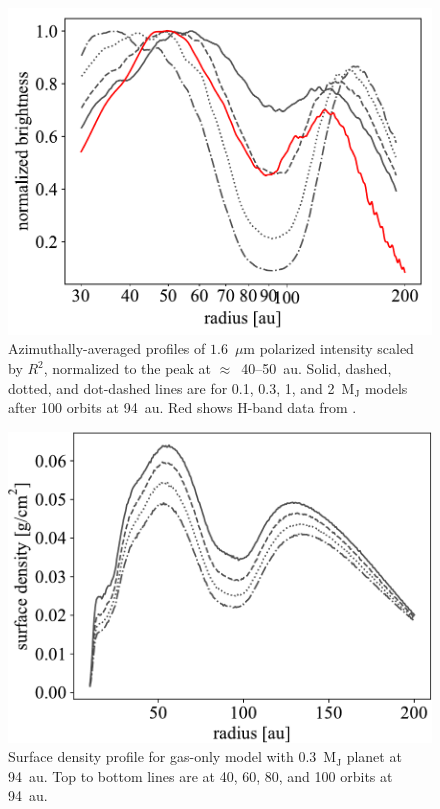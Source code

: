 \documentclass[usenatbib,a4paper,times]{mnras}
\begin{document}
\begin{figure}
   \begin{center}
      \includegraphics[width=1.00\columnwidth]{figs/scattered-radial.pdf}
      \caption{Azimuthally-averaged profiles of $1.6$~$\mu$m polarized intensity
         scaled by $R^2$, normalized to the peak at $\approx$~40--50~au. Solid,
         dashed, dotted, and dot-dashed lines are for 0.1, 0.3, 1, and
         2~$\mathrm{M_J}$ models after 100 orbits at 94~au. Red shows H-band
         data from \citet{van-boekel:2017}.\label{fig:scattered-radial}}
   \end{center}
\end{figure}

\begin{figure}
   \begin{center}
      \includegraphics[width=1.00\columnwidth]{figs/gap.pdf}
      \caption{Surface density profile for gas-only model with
         0.3~$\mathrm{M_J}$ planet at 94~au. Top to bottom lines are at 40, 60,
         80, and 100 orbits at 94~au.\label{fig:gap}}
   \end{center}
\end{figure}
\end{document}
